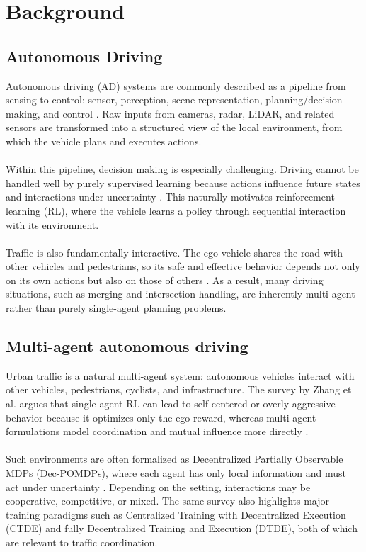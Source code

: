 \chapter{Background}
\label{cha:2}

\section{Autonomous Driving}

Autonomous driving (AD) systems are commonly described as a pipeline from sensing to control: sensor, perception, scene representation, planning/decision making, and control \cite{kiran2021deepreinforcementlearningautonomous}. Raw inputs from cameras, radar, LiDAR, and related sensors are transformed into a structured view of the local environment, from which the vehicle plans and executes actions.
\\
\\
Within this pipeline, decision making is especially challenging. Driving cannot be handled well by purely supervised learning because actions influence future states and interactions under uncertainty \cite{kiran2021deepreinforcementlearningautonomous}. This naturally motivates reinforcement learning (RL), where the vehicle learns a policy through sequential interaction with its environment.
\\
\\
Traffic is also fundamentally interactive. The ego vehicle shares the road with other vehicles and pedestrians, so its safe and effective behavior depends not only on its own actions but also on those of others \cite{zhang2024multiagentreinforcementlearningautonomous}. As a result, many driving situations, such as merging and intersection handling, are inherently multi-agent rather than purely single-agent planning problems.

\section{Multi-agent autonomous driving}

Urban traffic is a natural multi-agent system: autonomous vehicles interact with other vehicles, pedestrians, cyclists, and infrastructure. The survey by Zhang et al. argues that single-agent RL can lead to self-centered or overly aggressive behavior because it optimizes only the ego reward, whereas multi-agent formulations model coordination and mutual influence more directly \cite{zhang2024multiagentreinforcementlearningautonomous}.
\\
\\
Such environments are often formalized as Decentralized Partially Observable MDPs (Dec-POMDPs), where each agent has only local information and must act under uncertainty \cite{zhang2024multiagentreinforcementlearningautonomous}. Depending on the setting, interactions may be cooperative, competitive, or mixed. The same survey also highlights major training paradigms such as Centralized Training with Decentralized Execution (CTDE) and fully Decentralized Training and Execution (DTDE), both of which are relevant to traffic coordination.

